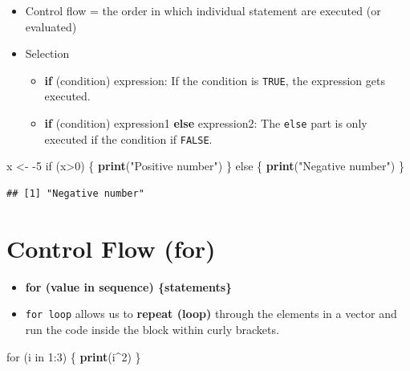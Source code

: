 \documentclass[]{book}
\newenvironment{Shaded}{\begin{snugshade}}{\end{snugshade}}
\newcommand{\KeywordTok}[1]{\textcolor[rgb]{0.13,0.29,0.53}{\textbf{{#1}}}}
\newcommand{\DecValTok}[1]{\textcolor[rgb]{0.00,0.00,0.81}{{#1}}}
\newcommand{\StringTok}[1]{\textcolor[rgb]{0.31,0.60,0.02}{{#1}}}
\newcommand{\NormalTok}[1]{{#1}}
\providecommand{\tightlist}{%
  \setlength{\itemsep}{0pt}\setlength{\parskip}{0pt}}
\begin{document}
\begin{itemize}
\tightlist
\item
  Control flow = the order in which individual statement are executed
  (or evaluated)
\item
  Selection

  \begin{itemize}
  \tightlist
  \item
    \textbf{if} (condition) expression: If the condition is
    \texttt{TRUE}, the expression gets executed.
  \item
    \textbf{if} (condition) expression1 \textbf{else} expression2: The
    \texttt{else} part is only executed if the condition if
    \texttt{FALSE}.
  \end{itemize}
\end{itemize}

\begin{Shaded}
\begin{Highlighting}[]
\NormalTok{x <-}\StringTok{ }\NormalTok{-}\DecValTok{5}
\NormalTok{if (x>}\DecValTok{0}\NormalTok{) \{}
  \KeywordTok{print}\NormalTok{(}\StringTok{"Positive number"}\NormalTok{)}
\NormalTok{\} else \{}
  \KeywordTok{print}\NormalTok{(}\StringTok{"Negative number"}\NormalTok{)}
\NormalTok{\}}
\end{Highlighting}
\end{Shaded}

\begin{verbatim}
## [1] "Negative number"
\end{verbatim}

\section{Control Flow (for)}\label{control-flow-for}

\begin{itemize}
\tightlist
\item
  \textbf{for (value in sequence) \{statements\}}
\item
  \texttt{for\ loop} allows us to \textbf{repeat (loop)} through the
  elements in a vector and run the code inside the block within curly
  brackets.
\end{itemize}

\begin{Shaded}
\begin{Highlighting}[]
\NormalTok{for (i in }\DecValTok{1}\NormalTok{:}\DecValTok{3}\NormalTok{) \{}
  \KeywordTok{print}\NormalTok{(i^}\DecValTok{2}\NormalTok{)}
\NormalTok{\}}
\end{Highlighting}
\end{Shaded}
\end{document}
